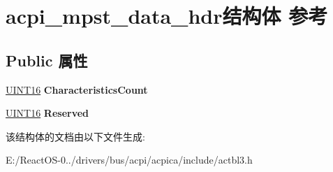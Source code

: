 \hypertarget{structacpi__mpst__data__hdr}{}\section{acpi\+\_\+mpst\+\_\+data\+\_\+hdr结构体 参考}
\label{structacpi__mpst__data__hdr}
\subsection*{Public 属性}
\begin{DoxyCompactItemize}
\item 
\mbox{\label{structacpi__mpst__data__hdr_a024ce45dced3ac29b85ed7d1704c8396}} 
\hyperlink{_processor_bind_8h_a09f1a1fb2293e33483cc8d44aefb1eb1}{U\+I\+N\+T16} {\bfseries Characteristics\+Count}
\item 
\mbox{\label{structacpi__mpst__data__hdr_a6d7c76199d158f4f5b5d7744929f391e}} 
\hyperlink{_processor_bind_8h_a09f1a1fb2293e33483cc8d44aefb1eb1}{U\+I\+N\+T16} {\bfseries Reserved}
\end{DoxyCompactItemize}


该结构体的文档由以下文件生成\+:\begin{DoxyCompactItemize}
\item 
E\+:/\+React\+O\+S-\/0../drivers/bus/acpi/acpica/include/actbl3.\+h\end{DoxyCompactItemize}
